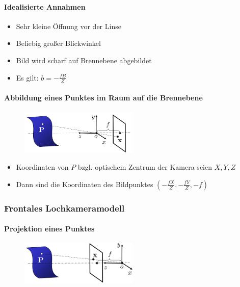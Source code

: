 \documentclass[12pt, a4paper, oneside]{article}
\begin{document}
\paragraph*{Idealisierte Annahmen}

\begin{itemize}
    \item Sehr kleine Öffnung vor der Linse
    \item Beliebig großer Blickwinkel
    \item Bild wird scharf auf Brennebene abgebildet
    \item Es gilt: $b = -\frac{fB}{Z}$
\end{itemize}

\paragraph*{Abbildung eines Punktes im Raum auf die Brennebene}

\begin{figure}[!h]
    \centering
    \includegraphics[width=0.5\textwidth]{../img/2-3.png}
    \label{img/2-3}
\end{figure}

\begin{itemize}
    \item Koordinaten von $P$ bzgl. optischem Zentrum der Kamera seien $X,Y,Z$
    \item Dann sind die Koordinaten des Bildpunktes $(-\frac{fX}{Z}, -\frac{fY}{Z}, -f)$
\end{itemize}

\subsubsection{Frontales Lochkameramodell}

\paragraph*{Projektion eines Punktes}

\begin{figure}[!h]
    \centering
    \includegraphics[width=0.5\textwidth]{../img/2-4.png}
    \label{img/2-4}
\end{figure}
\end{document}

